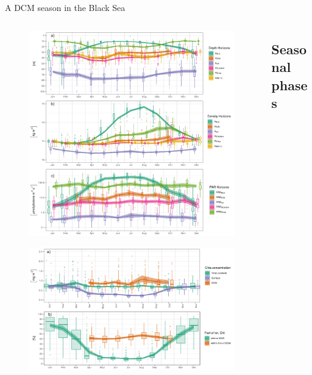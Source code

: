 \documentclass[final]{beamer}
\begin{document}
\begin{frame}[fragile]
\begin{columns}[T]
\begin{column}{.64\textwidth}
\begin{block}{ A DCM season in the Black Sea }
\begin{columns}[T]
	    \begin{column}{.33\textwidth}
		    \begin{figure}
     		    \includegraphics[width=\columnwidth]{figs/FIG5.png}
		    \end{figure}
		    \begin{figure}
     		    \includegraphics[width=\columnwidth]{figs/FIG6.png}
		    \end{figure}
	    \end{column}

	    \begin{column}{.42\textwidth}
	    \subsection{Seasonal phases}


\end{column}
\end{columns}
\end{block}
\end{column}
\end{columns}
\end{frame}
\end{document}
